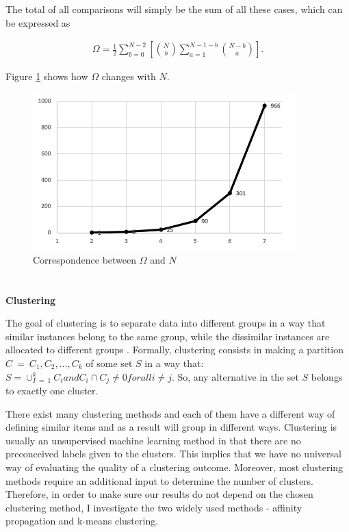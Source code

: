 \documentclass[a4paper,12pt]{article}
\begin{document}
The total of all comparisons will simply be the sum of all these cases, which can be expressed as

\begin{align}\label{eq:compromiseEffectDetailedCalculation}
    \Omega=\frac{1}{2}\sum_{b=0}^{N-2}\left[\binom{N}{b}\sum_{a=1}^{N-1-b}\binom{N-b}{a}\right].    
\end{align}


Figure \ref{fig:compromiseComparisonPlot} shows how $\Omega$ changes with $N$.

\begin{figure}[H]
    \centering
    \includegraphics[width=0.9\textwidth]{staticFiles/compromiseComparisonsZakAppendix.png}
    \caption{Correspondence between $\Omega$ and $N$}
    \label{fig:compromiseComparisonPlot}
\end{figure}


\newpage
\section{}\label{appendix:clusteringAlgorithms}

\textbf{Clustering}

The goal of clustering is to separate data into different groups in a way that similar instances belong to the same group, while the dissimilar instances are allocated to different groups \citep{maimon2005data}. Formally, clustering consists in making a partition $C\ =\ {C_1,C_2,\ldots,C_k}$ of some set $S$ in a way that: $S=\cup_{I\ =\ 1}^kC_i and C_i\cap C_j\neq0 for all i\neq j$. So, any alternative in the set $S$ belongs to exactly one cluster.

There exist many clustering methods and each of them have a different way of defining similar items and as a result will group in different ways. Clustering is usually an unsupervised machine learning method in that there are no preconceived labels given to the clusters. This implies that we have no universal way of evaluating the quality of a clustering outcome. Moreover, most clustering methods require an additional input to determine the number of clusters.  Therefore, in order to make sure our results do not depend on the chosen clustering method, I investigate the two widely used methods - affinity propagation and k-means clustering.
\end{document}
